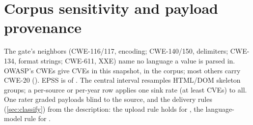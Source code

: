 \section{Corpus sensitivity and payload provenance}
\label{sec:appendix:corpus}

\begin{table}[h]
\centering
\caption{Delimitable share (scope, exploitation), contained share
(projection), and attack strings among \dataPayloadAuditPerSource graded
payloads per source (provenance). 95\% intervals.}
\label{tab:sens}
\footnotesize
\setlength{\tabcolsep}{4pt}

\end{table}

The gate's neighbors (CWE-116/117, encoding; CWE-140/150, delimiters; CWE-134,
format strings; CWE-611, XXE) name no language a value is parsed in. OWASP's
\dataOwaspCWEs CWEs give \dataOwaspStyleCVEs CVEs in this snapshot,
\dataOwaspStyleInCorpus in the corpus; most others carry CWE-20
(\dataOwaspStyleCweTwenty). EPSS is of \dataEpssDate. The central interval
resamples HTML/DOM skeleton groups; a per-source or per-year row applies one
sink rate (at least \dataMinStratum{} CVEs) to all. One rater graded payloads
blind to the source, and the delivery rules (\cref{sec:classify}) from the description: the upload
rule holds for \dataRulePrecisionWholeDocument, the language-model rule for
\dataRulePrecisionLlmMediated.
